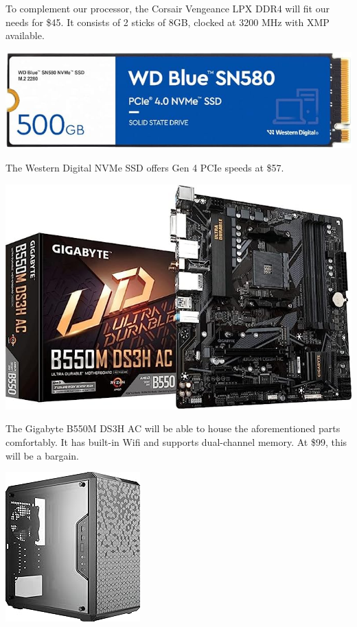 \documentclass[12pt, a4paper]{article}
\begin{document}
To complement our processor, the Corsair Vengeance LPX DDR4 will fit our
needs for \$45. It consists of 2 sticks of 8GB, clocked at 3200 MHz
with XMP available.

\vspace{4pt}
\begin{center}
  \includegraphics[scale=0.2]{ssssssssssssd.jpg}
\end{center}

The Western Digital NVMe SSD offers Gen 4 PCIe speeds at \$57.

\vspace{4pt}
\begin{center}
  \includegraphics[scale=0.32]{mothaaaaaaaaaaa.jpg}
\end{center}

The Gigabyte B550M DS3H AC will be able to house the aforementioned
parts comfortably. It has built-in Wifi and supports dual-channel 
memory. At \$99, this will be a bargain.

\vspace{4pt}
\begin{center}
  \includegraphics[scale=0.6]{colaaaaaaaaaa.jpg}
\end{center}
\end{document}
